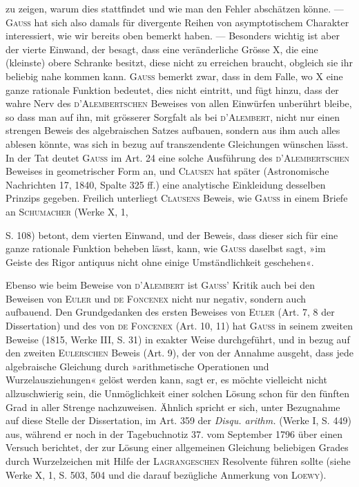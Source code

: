 zu zeigen, warum dies stattfindet und wie man den Fehler abschätzen könne.
— \textsc{Gauss} hat sich also damals für divergente Reihen von asymptotischem
Charakter interessiert, wie wir bereits oben bemerkt haben. — Besonders
wichtig ist aber der vierte Einwand, der besagt, dass eine veränderliche Grösse
\(\mathrm{X}\), die eine (kleinste) obere Schranke besitzt, diese nicht zu erreichen braucht,
obgleich sie ihr beliebig nahe kommen kann. \textsc{Gauss} bemerkt zwar, dass in
dem Falle, wo \(\mathrm{X}\) eine ganze rationale Funktion bedeutet, dies nicht eintritt,
und fügt hinzu, dass der wahre Nerv des \textsc{d’Alembertschen} Beweises von allen
Einwürfen unberührt bleibe, so dass man auf ihn, mit grösserer Sorgfalt als
bei \textsc{d’Alembert}, nicht nur einen strengen Beweis des algebraischen Satzes
aufbauen, sondern aus ihm auch alles ablesen könnte, was sich in bezug auf
transzendente Gleichungen wünschen lässt. In der Tat deutet \textsc{Gauss} im Art. 24
eine solche Ausführung des \textsc{d’Alembertschen} Beweises in geometrischer Form
an, und \textsc{Clausen} hat später (Astronomische Nachrichten 17, 1840, Spalte 325 ff.)
eine analytische Einkleidung desselben Prinzips gegeben. Freilich unterliegt
\textsc{Clausens} Beweis, wie \textsc{Gauss} in einem Briefe an \textsc{Schumacher} (Werke X, 1,\par
\clearpage{}
\noindent S. 108) betont, dem vierten Einwand, und der Beweis, dass dieser sich für
eine ganze rationale Funktion beheben lässt, kann, wie \textsc{Gauss} daselbst sagt,
»im Geiste des Rigor antiquus nicht ohne einige Umständlichkeit geschehen«.

Ebenso wie beim Beweise von \textsc{d’Alembert} ist \textsc{Gauss’} Kritik auch bei
den Beweisen von \textsc{Euler} und \textsc{de Foncenex} nicht nur negativ, sondern auch
aufbauend. Den Grundgedanken des ersten Beweises von \textsc{Euler} (Art. 7, 8
der Dissertation) und des von \textsc{de Foncenex} (Art. 10, 11) hat \textsc{Gauss} in seinem
zweiten Beweise (1815, Werke III, S. 31) in exakter Weise durchgeführt, und
in bezug auf den zweiten \textsc{Eulerschen} Beweis (Art. 9), der von der Annahme
ausgeht, dass jede algebraische Gleichung durch »arithmetische Operationen
und Wurzelausziehungen« gelöst werden kann, sagt er, es möchte vielleicht
nicht allzuschwierig sein, die Unmöglichkeit einer solchen Lösung schon für
den fünften Grad in aller Strenge nachzuweisen. Ähnlich spricht er sich,
unter Bezugnahme auf diese Stelle der Dissertation, im Art. 359 der \textit{Disqu.
arithm.} (Werke I, S. 449) aus, während er noch in der Tagebuchnotiz 37. vom
September 1796 über einen Versuch berichtet, der zur Lösung einer allgemeinen
Gleichung beliebigen Grades durch Wurzelzeichen mit Hilfe der \textsc{Lagrangeschen}
Resolvente führen sollte (siehe Werke X, 1, S. 503, 504 und die
darauf bezügliche Anmerkung von \textsc{Loewy}).

